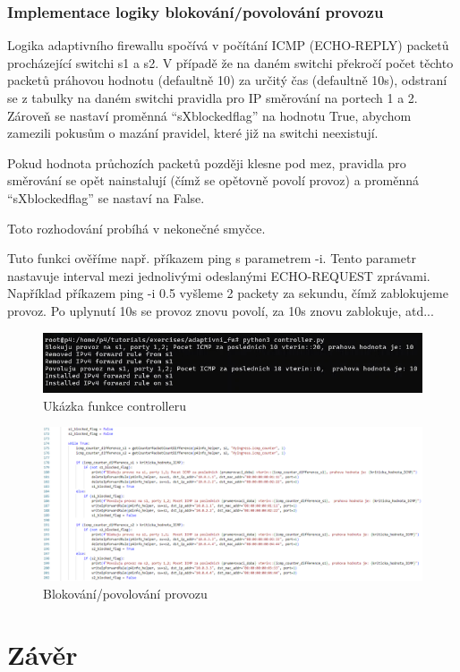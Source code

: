 \documentclass[czech, 11pt]{article}
\begin{document}
    \subsubsection{Implementace logiky blokování/povolování provozu}
    Logika adaptivního firewallu spočívá v počítání ICMP (ECHO-REPLY) packetů procházející switchi s1 a s2. V případě že na daném switchi překročí počet těchto packetů práhovou hodnotu (defaultně 10) za určitý čas (defaultně 10s), odstraní se z tabulky na daném switchi pravidla pro IP směrování na portech 1 a 2. Zároveň se nastaví proměnná \enquote{sX{\textunderscore}blocked{\textunderscore}flag} na hodnotu True, abychom zamezili pokusům o mazání pravidel, které již na switchi neexistují.

    Pokud hodnota průchozích packetů později klesne pod mez, pravidla pro směrování se opět nainstalují (čímž se opětovně povolí provoz) a proměnná \enquote{sX{\textunderscore}blocked{\textunderscore}flag} se nastaví na False.

    Toto rozhodování probíhá v nekonečné smyčce.

    \bigskip
    \bigskip

    Tuto funkci ověříme např. příkazem ping s parametrem -i. Tento parametr nastavuje interval mezi jednolivými odeslanými ECHO-REQUEST zprávami. Například příkazem ping -i 0.5 vyšleme 2 packety za sekundu, čímž zablokujeme provoz. Po uplynutí 10s se provoz znovu povolí, za 10s znovu zablokuje, atd...

    \begin{figure}[H]
		\centering
		\includegraphics[width=\textwidth]{Figures/controller/funkcni.png}
		\caption{Ukázka funkce controlleru}
		\label{...}
	\end{figure}

    \begin{landscape}
         \begin{figure}
            \centering
		      \includegraphics[scale=0.6]{Figures/controller/logika.png}
		      \caption{Blokování/povolování provozu}
		      \label{...}
         \end{figure}
    \end{landscape}

    \section{Závěr}
    
    
	\clearpage
	\printbibliography[title={Literatura}, heading=bibintoc] %
\end{document}
